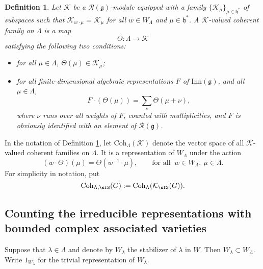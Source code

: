 \documentclass[12pt,a4paper]{amsart}
\newcommand{\CK}{{\mathcal {K}}}
\newcommand{\g}{\mathfrak g}
\newcommand{\h}{\mathfrak h}
\numberwithin{equation}{section}
\newtheorem{defn}[thm]{Definition}
\theoremstyle{remark}
\def\Coh{\mathrm{Coh}}
\begin{document}
\begin{defn}\label{defcoh}
  Let $\CK$  be a $\mathcal R(\g)$-module equipped with a family $\{\CK_\mu\}_{\mu\in  \h^*}$ of subspaces such that $\CK_{w\cdot \mu}=\CK_\mu$ for all $w\in W_\Lambda$ and $\mu\in \h^*$. 
  A $\CK$-valued coherent family on $\Lambda$ is a map
  \[
    \Theta: \Lambda\rightarrow \CK%
  \]
  satisfying the following two conditions:
  \begin{itemize}
  \item for all $\mu\in \Lambda$,
    $\Theta(\mu)\in \CK_\mu$;
  \item for all finite-dimensional algebraic representations $F$ of $\mathrm{Inn}(\g)$, and all $\mu\in \Lambda$, 
      \[
      F\cdot (\Theta(\mu)) = \sum_{\nu} \Theta(\mu+\nu),
  \]
  where $\nu$ runs over all weights of $F$, counted with multiplicities, and $F$ is obviously identified with an element of $\mathcal R(\g)$.
  \end{itemize}
  \end{defn}


In the notation of Definition \ref{defcoh},   let $\Coh_{\Lambda}(\CK)$ denote the vector space  of all $\mathcal K$-valued coherent families 
  on $\Lambda$. It is a representation of  $W_{\Lambda}$ under the action
  \[
    (w\cdot \Theta)(\mu) = \Theta(w^{-1}\cdot \mu), \qquad \textrm{for all }\  w\in W_\Lambda, \ \mu\in \Lambda.
  \]
For simplicity in notation, put
\[
\Coh_{\Lambda,\sfS}(G):=\Coh_{\Lambda}(\CK_\sfS(G)).
\]


\subsection{Counting the irreducible representations with bounded complex associated varieties}

Suppose that $\lambda\in \Lambda$ and denote by $W_\lambda$ the stabilizer of $\lambda$ in $W$. Then $W_\lambda\subset W_\Lambda$. Write $1_{W_\lambda}$  for the trivial representation of $W_{\lambda}$.
\end{document}
